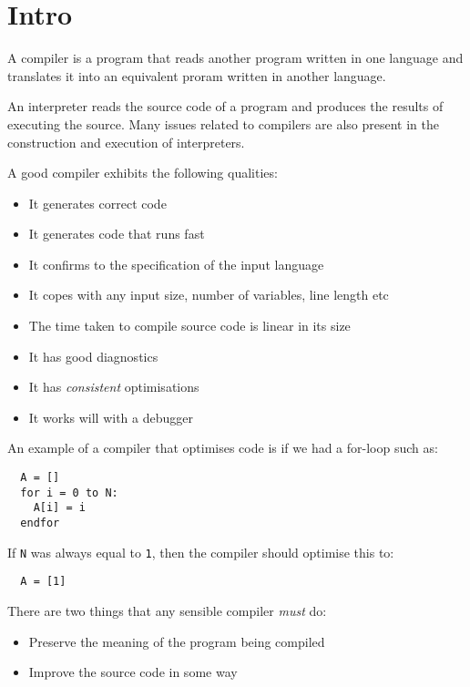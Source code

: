 
\section{Intro}

A compiler is a program that reads another program written in one language and
translates it into an equivalent proram written in another language.

An interpreter reads the source code of a program and produces the results of
executing the source. Many issues related to compilers are also present in the
construction and execution of interpreters.

A good compiler exhibits the following qualities:

\begin{itemize}
  \item It generates correct code
  \item It generates code that runs fast
  \item It confirms to the specification of the input language
  \item It copes with any input size, number of variables, line length etc
  \item The time taken to compile source code is linear in its size
  \item It has good diagnostics
  \item It has \textit{consistent} optimisations
  \item It works will with a debugger
\end{itemize}

An example of a compiler that optimises code is if we had a for-loop such as:

\begin{verbatim}
  A = []
  for i = 0 to N:
    A[i] = i
  endfor
\end{verbatim}

If \texttt{N} was always equal to \texttt{1}, then the compiler should optimise
this to:

\begin{verbatim}
  A = [1]
\end{verbatim}

There are two things that any sensible compiler \textit{must} do:

\begin{itemize}
  \item Preserve the meaning of the program being compiled
  \item Improve the source code in some way
\end{itemize}

